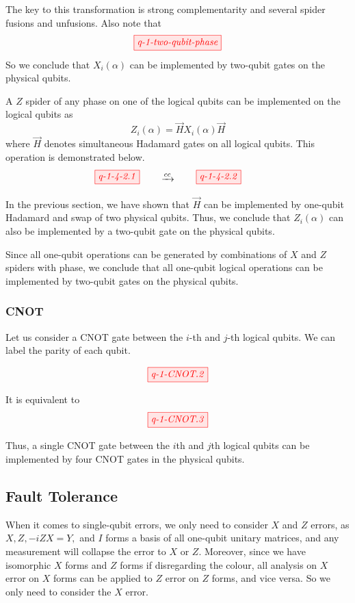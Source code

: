 The key to this transformation is strong complementarity and several spider fusions and unfusions. 
Also note that 
$$
\tikzfig{q-1-two-qubit-phase}
$$
So we conclude that $X_i(\alpha)$ can be implemented by two-qubit gates on the physical qubits.

A $Z$ spider of any phase on one of the logical qubits can be implemented on the logical qubits as 
$$
Z_i(\alpha) = \vec{H} X_i(\alpha) \vec{H}
$$
where $\vec{H}$ denotes simultaneous Hadamard gates on all logical qubits. 
This operation is demonstrated below.
$$
\tikzfig{q-1-4-2.1} \qquad \xrightarrow{cc}  \qquad \tikzfig{q-1-4-2.2}  \qquad 
$$

In the previous section, we have shown that $\vec{H}$ can be implemented by one-qubit Hadamard and swap of two physical qubits. Thus, we conclude that $Z_i(\alpha)$ can also be implemented by a two-qubit gate on the physical qubits.

Since all one-qubit operations can be generated by combinations of $X$ and $Z$ spiders with phase, we conclude that all one-qubit logical operations can be implemented by two-qubit gates on the physical qubits.

\subsubsection{CNOT}

Let us consider a CNOT gate between the $i$-th and $j$-th logical qubits. 
We can label the parity of each qubit.

\begin{align*}
	\tikzfig{q-1-CNOT.2} 
\end{align*}

It is equivalent to 
$$
\tikzfig{q-1-CNOT.3}
$$

Thus, a single CNOT gate between the $i$th and $j$th logical qubits can be implemented by four CNOT gates in the physical qubits.

\subsection{Fault Tolerance}

When it comes to single-qubit errors, we only need to consider $X$ and $Z$ errors, as $X, Z, -iZX = Y,$ and $I$ forms a basis of all one-qubit unitary matrices, and any measurement will collapse the error to $X$ or $Z$.
Moreover, since we have isomorphic $X$ forms and $Z$ forms if disregarding the colour, all analysis on $X$ error on $X$ forms can be applied to $Z$ error on $Z$ forms, and vice versa.
So we only need to consider the $X$ error.


